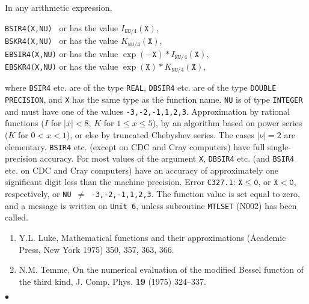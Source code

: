 \Usage
In any arithmetic expression,
\begin{center}
\parbox{.8\textwidth}{
{\tt BSIR4(X,NU)\ } \quad or 
\quad has the value \quad $I_{\mathtt{NU}/4}(\mathtt{X})$, \\
{\tt BSKR4(X,NU)\ } \quad or 
\quad has the value \quad $K_{\mathtt{NU}/4}(\mathtt{X})$, \\
{\tt EBSIR4(X,NU)} \quad or 
\quad has the value \quad
$\exp(-\mathtt{X}) * I_{\mathtt{NU}/4}(\mathtt{X})$, \\
{\tt EBSKR4(X,NU)} \quad or 
\quad has the value \quad
$\exp(\mathtt{X}) * K_{\mathtt{NU}/4}(\mathtt{X})$,
}\end{center}
where {\tt BSIR4} etc. are of the type {\tt REAL}, {\tt DBSIR4} etc.
are of the type {\tt DOUBLE PRECISION}, and {\tt X} has the same type as
the function name. {\tt NU} is of type {\tt INTEGER}
and must have one of the values {\tt -3,-2,-1,1,2,3}.
\Method
Approximation by rational functions ($I$ for $|x|<8$, $K$ for
$1 \le x \le 5$), by an algorithm based on power series ($K$ for
$0 < x < 1$), or else by truncated Chebyshev series. The cases
$|\nu|=2$ are elementary.
\Accuracy
{\tt BSIR4} etc. (except on CDC and Cray computers)
have full single-precision accuracy.
For most values of the argument {\tt X}, {\tt DBSIR4} etc.
(and {\tt BSIR4} etc. on CDC and Cray computers) have an accuracy of
approximately one significant digit less than the machine precision.
\Errorh
Error {\tt C327.1}:
$\mathtt{X \leq 0}$, or $\mathtt{X<0}$, respectively, or
{\tt NU $\neq$ -3,-2,-1,1,2,3}.
The function value is set equal to zero, and a message is written on
{\tt Unit 6}, unless subroutine {\tt MTLSET} (N002) has been called.
\Refer
\begin{enumerate}
\item Y.L. Luke, Mathematical functions and their
approximations (Academic Press, New York 1975) 350, 357, 363, 366.
\item N.M. Temme, On the numerical evaluation of the modified Bessel
function of the third kind, J. Comp. Phys. {\bf 19} (1975) 324--337.
\end{enumerate}
$\bullet$
